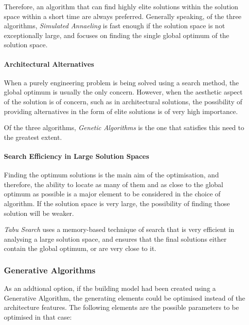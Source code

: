 Therefore, an algorithm that can find highly elite solutions within the solution space within a short time are always preferred. Generally speaking, of the three algorithms, \emph{Simulated Annaeling} is fast enough if the solution space is not exceptionally large, and focuses on finding the single global optimum of the solution space.

\paragraph{Architectural Alternatives}\mbox{}\vspace{-0.4cm}

When a purely engineering problem is being solved using a search method, the global optimum is usually the only concern. However, when the aesthetic aspect of the solution is of concern, such as in architectural solutions, the possibility of providing alternatives in the form of elite solutions is of very high importance.

Of the three algorithms, \emph{Genetic Algorithms} is the one that satisfies this need to the greatest extent.

\paragraph{Search Efficiency in Large Solution Spaces}\mbox{}\vspace{-0.4cm}

Finding the optimum solutions is the main aim of the optimisation, and therefore, the ability to locate as many of them and as close to the global optimum as possible is a major element to be considered in the choice of algorithm. If the solution space is very large, the possibility of finding those solution will be weaker.

\emph{Tabu Search} uses a memory-based technique of search that is very efficient in analysing a large solution space, and ensures that the final solutions either contain the global optimum, or are very close to it.



\subsubsection{Generative Algorithms}

As an addtional option, if the building model had been created using a Generative Algorithm, the generating elements could be optimised instead of the architecture features. The following elements are the possible parameters to be optimised in that case:

